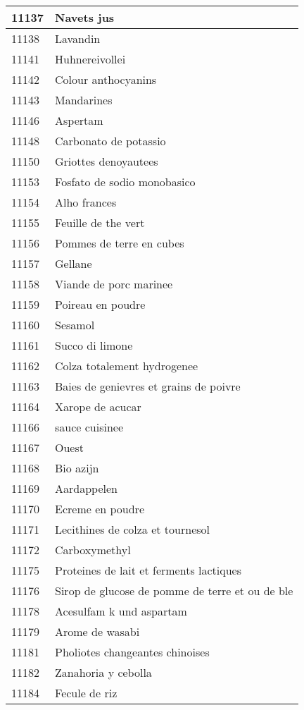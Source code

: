 \begin{longtable}{|l|l|}
11137 & Navets jus \\ \hline 
11138 & Lavandin \\ \hline 
11141 & Huhnereivollei \\ \hline 
11142 & Colour anthocyanins \\ \hline 
11143 & Mandarines \\ \hline 
11146 & Aspertam \\ \hline 
11148 & Carbonato de potassio \\ \hline 
11150 & Griottes denoyautees \\ \hline 
11153 & Fosfato de sodio monobasico \\ \hline 
11154 & Alho frances \\ \hline 
11155 & Feuille de the vert \\ \hline 
11156 & Pommes de terre en cubes \\ \hline 
11157 & Gellane \\ \hline 
11158 & Viande de porc marinee \\ \hline 
11159 & Poireau en poudre \\ \hline 
11160 & Sesamol \\ \hline 
11161 & Succo di limone \\ \hline 
11162 & Colza totalement hydrogenee \\ \hline 
11163 & Baies de genievres et grains de poivre \\ \hline 
11164 & Xarope de acucar \\ \hline 
11166 & sauce cuisinee \\ \hline 
11167 & Ouest \\ \hline 
11168 & Bio azijn \\ \hline 
11169 & Aardappelen \\ \hline 
11170 & Ecreme en poudre \\ \hline 
11171 & Lecithines de colza et tournesol \\ \hline 
11172 & Carboxymethyl \\ \hline 
11175 & Proteines de lait et ferments lactiques \\ \hline 
11176 & Sirop de glucose de pomme de terre et ou de ble \\ \hline 
11178 & Acesulfam k und aspartam \\ \hline 
11179 & Arome de wasabi \\ \hline 
11181 & Pholiotes changeantes chinoises \\ \hline 
11182 & Zanahoria y cebolla \\ \hline 
11184 & Fecule de riz \\ \hline 

\end{longtable}
